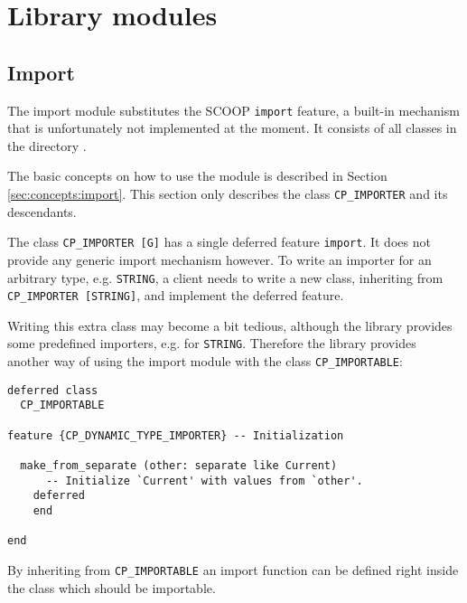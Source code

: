 \section{Library modules}
\label{sec:modules}

\subsection{Import}
\label{sec:modules:import}

The import module substitutes the SCOOP \lstinline!import! feature, a built-in mechanism that is unfortunately not implemented at the moment.
It consists of all classes in the directory .

The basic concepts on how to use the module is described in Section \ref{sec:concepts:import}.
This section only describes the class \lstinline!CP_IMPORTER! and its descendants.

The class \lstinline!CP_IMPORTER [G]! has a single deferred feature \lstinline!import!.
It does not provide any generic import mechanism however.
To write an importer for an arbitrary type, e.g. \lstinline!STRING!, a client needs to write a new class, inheriting from \lstinline!CP_IMPORTER [STRING]!, and implement the deferred feature.

Writing this extra class may become a bit tedious, although the library provides some predefined importers, e.g. for \lstinline!STRING!.
Therefore the library provides another way of using the import module with the class \lstinline!CP_IMPORTABLE!:

\begin{lstlisting}[captionpos=b, caption={The deferred class CP\_IMPORTABLE.}]
deferred class
  CP_IMPORTABLE

feature {CP_DYNAMIC_TYPE_IMPORTER} -- Initialization

  make_from_separate (other: separate like Current)
      -- Initialize `Current' with values from `other'.
    deferred
    end

end
\end{lstlisting}

By inheriting from \lstinline!CP_IMPORTABLE! an import function can be defined right inside the class which should be importable.

